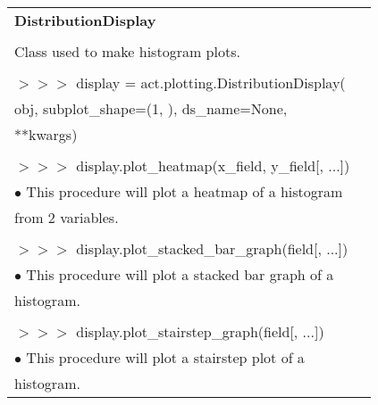 \documentclass[potrait, z1paper, fontscale=0.33]{baposter} %
\begin{document}
\begin{poster}
{\begin{flushleft}
\begin{tabular}{@{}ll@{}}
\\
\multicolumn{2}{l}{\cellcolor[HTML]{DDFFFF}\bf DistributionDisplay} \\
\\
Class used to make histogram plots.\\
\\
$>$$>$$>$ display = act.plotting.DistributionDisplay(\\
\-\hspace{1.2cm} obj, subplot\_shape=(1, ), ds\_name=None,\\
\-\hspace{1.2cm} **kwargs)\\
\\
$>$$>$$>$ display.plot\_heatmap(x\_field, y\_field[, ...])\\
\-\hspace{0.2cm} $\bullet$ This procedure will plot a heatmap of a histogram\\
\-\hspace{0.5cm} from 2 variables.\\
\\
$>$$>$$>$ display.plot\_stacked\_bar\_graph(field[, ...])\\
\-\hspace{0.2cm} $\bullet$ This procedure will plot a stacked bar graph of a\\
\-\hspace{0.5cm} histogram.\\
\\
$>$$>$$>$ display.plot\_stairstep\_graph(field[, ...])\\
\-\hspace{0.2cm} $\bullet$ This procedure will plot a stairstep plot of a\\
\-\hspace{0.5cm} histogram.\\
\end{tabular}

\end{flushleft}
}



\end{poster}
\end{document}
